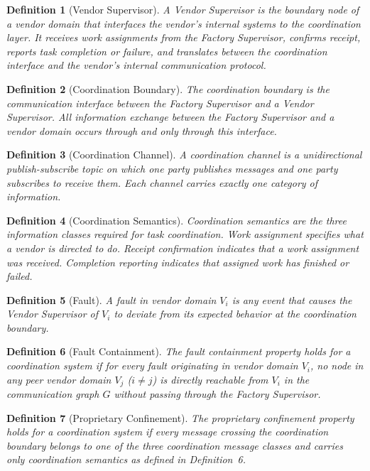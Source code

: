 \documentclass[a4paper,fleqn]{cas-dc}
\newtheorem{definition}{Definition}
\begin{document}
\begin{definition}[Vendor Supervisor]
A Vendor Supervisor is the boundary node of a vendor domain that interfaces the vendor's internal systems to the coordination layer. It receives work assignments from the Factory Supervisor, confirms receipt, reports task completion or failure, and translates between the coordination interface and the vendor's internal communication protocol.
\end{definition}

\begin{definition}[Coordination Boundary]
The coordination boundary is the communication interface between the Factory Supervisor and a Vendor Supervisor. All information exchange between the Factory Supervisor and a vendor domain occurs through and only through this interface.
\end{definition}

\begin{definition}[Coordination Channel]
A coordination channel is a unidirectional publish-subscribe topic on which one party publishes messages and one party subscribes to receive them. Each channel carries exactly one category of information.
\end{definition}

\begin{definition}[Coordination Semantics]
Coordination semantics are the three information classes required for task coordination. Work assignment specifies what a vendor is directed to do. Receipt confirmation indicates that a work assignment was received. Completion reporting indicates that assigned work has finished or failed.
\end{definition}

\begin{definition}[Fault]
A fault in vendor domain $V_i$ is any event that causes the Vendor Supervisor of $V_i$ to deviate from its expected behavior at the coordination boundary.
\end{definition}

\begin{definition}[Fault Containment]
The fault containment property holds for a coordination system if for every fault originating in vendor domain $V_i$, no node in any peer vendor domain $V_j$ ($i \neq j$) is directly reachable from $V_i$ in the communication graph $G$ without passing through the Factory Supervisor.
\end{definition}

\begin{definition}[Proprietary Confinement]
The proprietary confinement property holds for a coordination system if every message crossing the coordination boundary belongs to one of the three coordination message classes and carries only coordination semantics as defined in Definition~6.
\end{definition}
\end{document}
